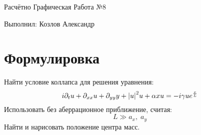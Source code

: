 \documentclass[titlepage]{article}
\begin{document}
\begin{flushright}
    Расчётно Графическая Работа №8
    
    Выполнил: Козлов Александр
\end{flushright}
\section{Формулировка}
Найти условие коллапса для решения уравнения:
\begin{equation}
 i\partial_t u + \partial_{xx}u + \partial_{yy}y + \abs{u}^2 u + \alpha x u = -i\gamma u e^{\frac{x}{L}}
\end{equation}
Использовать без аберрационное приближение, считая:
\begin{equation}
 L \gg a_x,\; a_y
\end{equation}
Найти и нарисовать положение центра масс.
\end{document}
